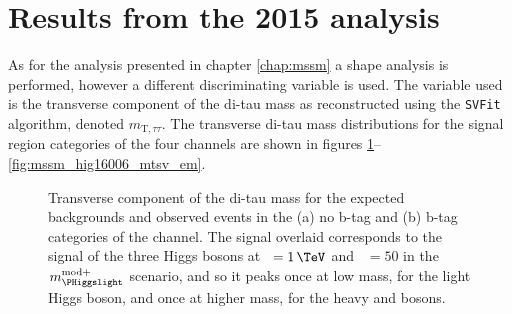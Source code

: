 \section{Results from the 2015 analysis}
\label{sec:mssm_combination_2015}
As for the analysis presented in 
chapter \ref{chap:mssm} a shape analysis is performed, however a different
discriminating variable is used. The variable used is the transverse component of the di-tau mass
as reconstructed using the \texttt{SVFit} algorithm, 
denoted $m_{\text{T},\tau\tau}$. The transverse di-tau mass 
distributions for the signal region categories of the four channels are shown in figures \ref{fig:mssm_hig16006_mtsv_mt}--\ref{fig:mssm_hig16006_mtsv_em}.
\begin{figure}[h!]
\begin{center}
\end{center}
\caption[Transverse component of the di-tau mass for the expected backgrounds
and observed events in the no b-tag and b-tag categories of the \mutau channel.]{Transverse component of the di-tau mass for the expected backgrounds and
observed events in the (a) no b-tag and (b) b-tag categories of the \mutau channel.
The signal overlaid corresponds to the signal of the three Higgs bosons at \mA~$=1\,\TeV$ and \tanb~$=50$
in the $m_{\text{\PHiggslight}}^{\text{mod+}}$ scenario, and so it peaks once at low mass, for the light Higgs boson,
and once at higher mass, for the heavy \PHiggs and \PHiggsps bosons.}
\label{fig:mssm_hig16006_mtsv_mt}
\end{figure}

